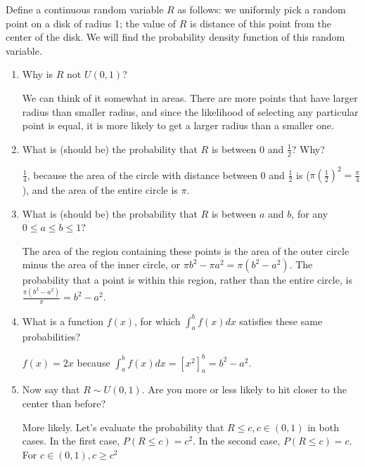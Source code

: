 \question Define a continuous random variable $R$ as follows: we uniformly pick 
a random point on a disk of radius 1; the value of $R$ is distance of 
this point from the center of the disk. We will find the probability 
density function of this random variable.

\begin{enumerate}[label=(\alph*)]
\item Why is $R$ not $U(0,1)$?
\begin{solution}[0.5cm]
We can think of it somewhat in areas. There are more points that have larger radius than smaller radius, and since the likelihood of selecting any particular point is equal, it is more likely to get a larger radius than a smaller one.
\end{solution}
\item What is (should be) the probability that $R$ is between 0 and 
$\frac{1}{2}$? Why?
\begin{solution}[.5cm]
$\frac{1}{4}$, because the area of the circle with distance between 
0 and $\frac{1}{2}$ is ($\pi(\frac{1}{2})^2 = \frac{\pi}{4}$), and 
the area of the entire circle is $\pi$.
\end{solution}

\item What is (should be) the probability that $R$ is between $a$ 
and $b$, for any $0 \le a \le b \le 1$?
\begin{solution}[.5cm]
The area of the region containing these points is the area of the 
outer circle minus the area of the inner circle, or $\pi b^2 - \pi a^2 
= \pi(b^2 - a^2)$. The probability that a point is within this region, 
rather than the entire circle, is $\frac{\pi(b^2 - a^2)}{\pi} = b^2 - a^2$.
\end{solution}

\item What is a function $f(x)$, for which $\int_{a}^{b} f(x)dx$ 
satisfies these same probabilities?
\begin{solution}[.5cm] $f(x) = 2x$ because $\int_{a}^{b} f(x)dx = 
[x^2]_{a}^{b} = b^2 - a^2$. \end{solution}
\item Now say that $R \sim U(0,1)$. Are you more or less likely to hit closer to the center than before?
\begin{solution}
More likely. Let's evaluate the probability that $R\le c, c \in (0,1)$ in both cases. In the first case, $P(R\le c) = c^2$. In the second case, $P(R\le c) = c$. For $c \in (0,1), c \ge c^2$
\end{solution}

\end{enumerate}